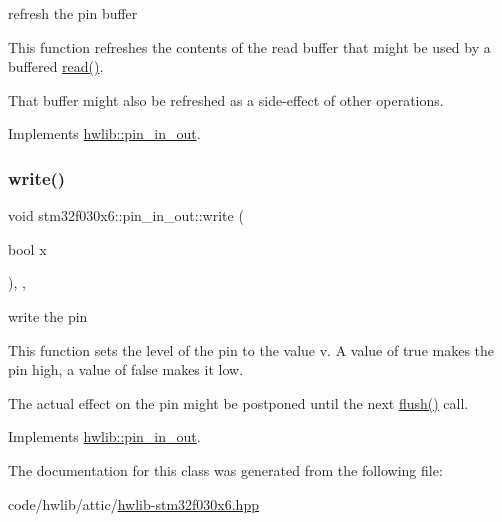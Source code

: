 refresh the pin buffer

This function refreshes the contents of the read buffer that might be used by a buffered \hyperlink{classstm32f030x6_1_1pin__in__out_a94c8a2495046a0240cf7bc42e870d289}{read()}.

That buffer might also be refreshed as a side-\/effect of other operations. 

Implements \hyperlink{classhwlib_1_1pin__in__out_a8815baac4e5193ec68795956f5e363a6}{hwlib\+::pin\+\_\+in\+\_\+out}.

\mbox{\label{classstm32f030x6_1_1pin__in__out_a395ac1700d5df47ef841ae4405837e1d}} 
\subsubsection{\texorpdfstring{write()}{write()}}
{\footnotesize\ttfamily void stm32f030x6\+::pin\+\_\+in\+\_\+out\+::write (\begin{DoxyParamCaption}\item[{bool}]{x }\end{DoxyParamCaption})\hspace{0.3cm}{\ttfamily [inline]}, {\ttfamily [override]}, {\ttfamily [virtual]}}

write the pin

This function sets the level of the pin to the value v. A value of true makes the pin high, a value of false makes it low.

The actual effect on the pin might be postponed until the next \hyperlink{classstm32f030x6_1_1pin__in__out_a89e04e9a27e2eab76739b4c9195abd34}{flush()} call. 

Implements \hyperlink{classhwlib_1_1pin__in__out_aa5e2adcb5707f86c20b6306fc09f1582}{hwlib\+::pin\+\_\+in\+\_\+out}.



The documentation for this class was generated from the following file\+:\begin{DoxyCompactItemize}
\item 
code/hwlib/attic/\hyperlink{hwlib-stm32f030x6_8hpp}{hwlib-\/stm32f030x6.\+hpp}\end{DoxyCompactItemize}
